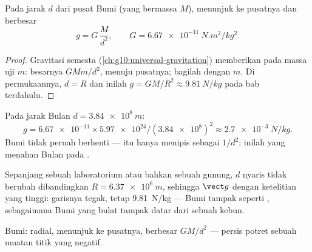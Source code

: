 \begin{proposition}\label{prop:g11:electric-gravitational-fields:earth}
Pada jarak $d$ dari pusat Bumi (yang bermassa $M$), 
menunjuk ke pusatnya dan berbesar
\[
g = G\,\frac{M}{d^2},
\qquad G = \qty{6.67e-11}{N.m^2/kg^2}.
\]
\end{proposition}

\begin{proof}
Gravitasi semesta (\cref{ch:g10:universal-gravitation}) memberikan 
pada massa uji $m$: besarnya $G M m / d^2$, menuju pusatnya; bagilah
dengan $m$. Di permukaannya, $d = R$ dan inilah
$g = GM/R^2 \approx \qty{9.81}{N/kg}$ pada bab terdahulu.
\end{proof}

\begin{example}\label{ex:g11:electric-gravitational-fields:moon}
Pada jarak Bulan $d = \qty{3.84e8}{m}$:
\[
g = \num{6.67e-11} \times \num{5.97e24} / (\num{3.84e8})^2
\approx \qty{2.7e-3}{N/kg}.
\]
 Bumi tidak pernah berhenti ---  itu hanya menipis sebagai
$1/d^2$; inilah  yang menahan Bulan pada .
\end{example}

\begin{remark}\label{rem:g11:electric-gravitational-fields:uniformg}
Sepanjang sebuah laboratorium atau bahkan sebuah gunung, $d$ nyaris
tidak berubah dibandingkan $R = \qty{6.37e6}{m}$, sehingga $\vect g$
 dengan ketelitian yang tinggi: garisnya tegak, tetap
\qty{9.81}{N/kg} ---  Bumi tampak seperti  ,
sebagaimana Bumi yang bulat tampak datar dari sebuah kebun.
\end{remark}

\begin{omfigure}

{\small {} Bumi: radial, menunjuk ke pusatnya, berbesar
$GM/d^2$ --- persis potret  sebuah muatan titik yang negatif.}
\end{omfigure}

